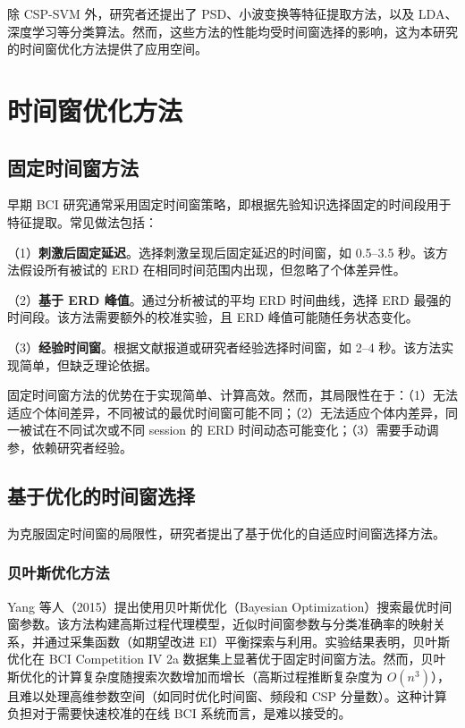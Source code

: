 除 CSP-SVM 外，研究者还提出了 PSD、小波变换等特征提取方法，以及 LDA、深度学习等分类算法\cite{lotte2007review}。然而，这些方法的性能均受时间窗选择的影响，这为本研究的时间窗优化方法提供了应用空间。

\section{时间窗优化方法}
\label{sec:time_window_optimization}

\subsection{固定时间窗方法}
\label{subsec:fixed_window}

早期 BCI 研究通常采用固定时间窗策略，即根据先验知识选择固定的时间段用于特征提取\cite{lotte2007review}。常见做法包括：

（1）\textbf{刺激后固定延迟}。选择刺激呈现后固定延迟的时间窗，如 0.5--3.5 秒\cite{tangermann2012review}。该方法假设所有被试的 ERD 在相同时间范围内出现，但忽略了个体差异性。

（2）\textbf{基于 ERD 峰值}。通过分析被试的平均 ERD 时间曲线，选择 ERD 最强的时间段\cite{pfurtscheller1999event}。该方法需要额外的校准实验，且 ERD 峰值可能随任务状态变化。

（3）\textbf{经验时间窗}。根据文献报道或研究者经验选择时间窗，如 2--4 秒\cite{lotte2007review}。该方法实现简单，但缺乏理论依据。

固定时间窗方法的优势在于实现简单、计算高效。然而，其局限性在于：（1）无法适应个体间差异，不同被试的最优时间窗可能不同；（2）无法适应个体内差异，同一被试在不同试次或不同 session 的 ERD 时间动态可能变化；（3）需要手动调参，依赖研究者经验\cite{lotte2011regularizing}。

\subsection{基于优化的时间窗选择}
\label{subsec:optimization_based}

为克服固定时间窗的局限性，研究者提出了基于优化的自适应时间窗选择方法。

\subsubsection{贝叶斯优化方法}

Yang 等人（2015）提出使用贝叶斯优化（Bayesian Optimization）搜索最优时间窗参数\cite{yang2015time}。该方法构建高斯过程代理模型，近似时间窗参数与分类准确率的映射关系，并通过采集函数（如期望改进 EI）平衡探索与利用。实验结果表明，贝叶斯优化在 BCI Competition IV 2a 数据集上显著优于固定时间窗方法\cite{yang2015time}。然而，贝叶斯优化的计算复杂度随搜索次数增加而增长（高斯过程推断复杂度为 $O(n^3)$），且难以处理高维参数空间（如同时优化时间窗、频段和 CSP 分量数）。这种计算负担对于需要快速校准的在线 BCI 系统而言，是难以接受的。

